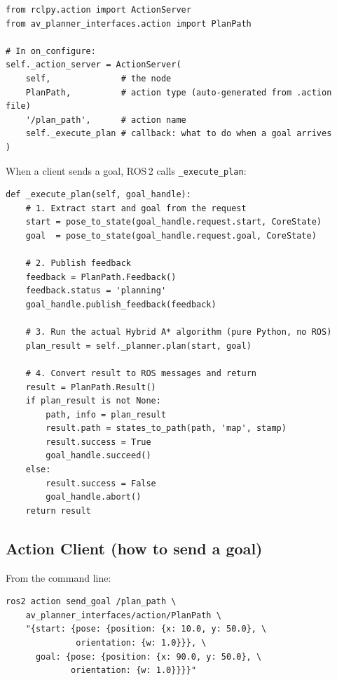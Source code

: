 \documentclass[12pt, a4paper]{article}
\begin{document}
\begin{lstlisting}[style=python, caption={Creating an action server (planner\_node.py)}]
from rclpy.action import ActionServer
from av_planner_interfaces.action import PlanPath

# In on_configure:
self._action_server = ActionServer(
    self,              # the node
    PlanPath,          # action type (auto-generated from .action file)
    '/plan_path',      # action name
    self._execute_plan # callback: what to do when a goal arrives
)
\end{lstlisting}

When a client sends a goal, ROS\,2 calls \texttt{\_execute\_plan}:

\begin{lstlisting}[style=python, caption={Action execute callback (planner\_node.py, simplified)}]
def _execute_plan(self, goal_handle):
    # 1. Extract start and goal from the request
    start = pose_to_state(goal_handle.request.start, CoreState)
    goal  = pose_to_state(goal_handle.request.goal, CoreState)

    # 2. Publish feedback
    feedback = PlanPath.Feedback()
    feedback.status = 'planning'
    goal_handle.publish_feedback(feedback)

    # 3. Run the actual Hybrid A* algorithm (pure Python, no ROS)
    plan_result = self._planner.plan(start, goal)

    # 4. Convert result to ROS messages and return
    result = PlanPath.Result()
    if plan_result is not None:
        path, info = plan_result
        result.path = states_to_path(path, 'map', stamp)
        result.success = True
        goal_handle.succeed()
    else:
        result.success = False
        goal_handle.abort()
    return result
\end{lstlisting}

\subsection{Action Client (how to send a goal)}

From the command line:

\begin{lstlisting}[style=bash, caption={Sending a planning goal via CLI}]
ros2 action send_goal /plan_path \
    av_planner_interfaces/action/PlanPath \
    "{start: {pose: {position: {x: 10.0, y: 50.0}, \
              orientation: {w: 1.0}}}, \
      goal: {pose: {position: {x: 90.0, y: 50.0}, \
             orientation: {w: 1.0}}}}"
\end{lstlisting}
\end{document}
